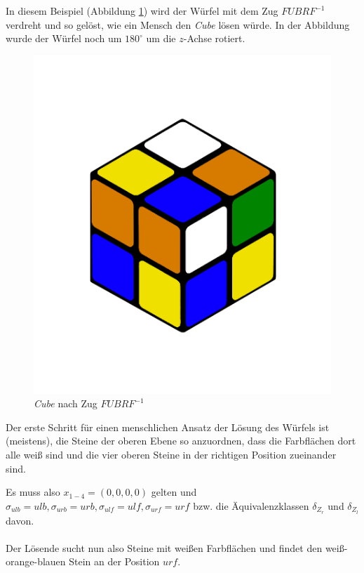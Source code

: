 \documentclass[12pt,a4paper, usenames, dvipsnames]{article}
\begin{document}
In diesem Beispiel (Abbildung \ref{18}) wird der Würfel mit dem Zug $FUBRF^{-1}$ verdreht und so gelöst, wie ein Mensch den \textit{Cube} lösen würde.
In der Abbildung wurde der Würfel noch um $180^\circ$ um die $z$-Achse rotiert.

\begin{figure}[h]
\centering
\includegraphics[scale=0.12]{LURFL1.png}
\caption{\textit{Cube} nach Zug $FUBRF^{-1}$ }
\label{18}
\end{figure}

Der erste Schritt für einen menschlichen Ansatz der Lösung des Würfels ist (meistens), die Steine der oberen Ebene so anzuordnen, dass die Farbflächen dort alle weiß sind und die vier oberen Steine in der richtigen Position zueinander sind. 


Es muss also $x_{1-4} = (0,0,0,0)$ gelten und $\sigma_{ulb}=ulb, \sigma_{urb} = urb, \sigma_{ulf} = ulf, \sigma_{urf}=urf$ bzw. die Äquivalenzklassen $\delta_{Z_r}$ und $\delta_{Z_l}$ davon. \\
\\
Der Lösende sucht nun also Steine mit weißen Farbflächen und findet den weiß-orange-blauen Stein an der Position $urf$. 
\end{document}
